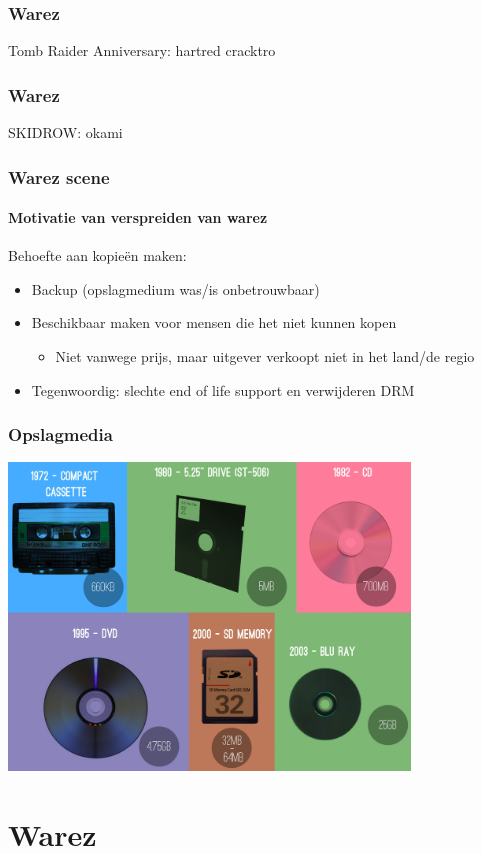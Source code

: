 \documentclass{beamer}
\begin{document}
\begin{frame}
	\frametitle{Warez}

	Tomb Raider Anniversary: hartred cracktro
\end{frame}

\begin{frame}
	\frametitle{Warez}

	SKIDROW: okami
\end{frame}

\begin{frame}
	\frametitle{Warez scene}
	\framesubtitle{Motivatie van verspreiden van warez}

	Behoefte aan kopie\"en maken:
	\begin{itemize}
		\item Backup (opslagmedium was/is onbetrouwbaar)
		\item Beschikbaar maken voor mensen die het niet kunnen kopen
		\begin{itemize}
			\item Niet vanwege prijs, maar uitgever verkoopt niet in het land/de regio
		\end{itemize}
		\item Tegenwoordig: slechte end of life support en verwijderen DRM
	\end{itemize}
\end{frame}

\begin{frame}
	\frametitle{Opslagmedia}

	\begin{center}
	\includegraphics[width=0.8\textwidth]{media.png}
	\end{center}
\end{frame}

\section{Warez}
\end{document}
